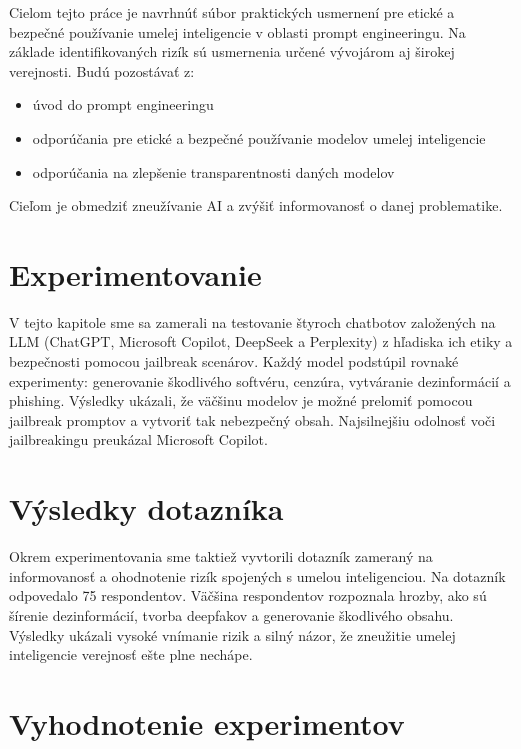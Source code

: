 Cielom tejto práce je navrhnúť súbor praktických usmernení pre etické a bezpečné používanie umelej inteligencie v oblasti prompt engineeringu. Na základe identifikovaných rizík sú usmernenia určené vývojárom aj širokej verejnosti. Budú pozostávať z: 

\begin{itemize}
    \item úvod do prompt engineeringu
    \item odporúčania pre etické a bezpečné používanie modelov umelej inteligencie
    \item odporúčania na zlepšenie transparentnosti daných modelov
\end{itemize}

Cieľom je obmedziť zneužívanie AI a zvýšiť informovanosť o danej problematike.

\section*{Experimentovanie \label{sec:experimenting_resume}}

V tejto kapitole sme sa zamerali na testovanie štyroch chatbotov založených na LLM (ChatGPT, Microsoft Copilot, DeepSeek a Perplexity) z hľadiska ich etiky a bezpečnosti pomocou jailbreak scenárov. Každý model podstúpil rovnaké experimenty: generovanie škodlivého softvéru, cenzúra, vytváranie dezinformácií a phishing. Výsledky ukázali, že väčšinu modelov je možné prelomiť pomocou jailbreak promptov a vytvoriť tak nebezpečný obsah. Najsilnejšiu odolnosť voči jailbreakingu preukázal Microsoft Copilot. 

\section*{Výsledky dotazníka \label{sec:survey_resume}}

Okrem experimentovania sme taktiež vyvtorili dotazník zameraný na informovanosť a ohodnotenie rizík spojených s umelou inteligenciou. Na dotazník odpovedalo 75 respondentov. Väčšina respondentov rozpoznala hrozby, ako sú šírenie dezinformácií, tvorba deepfakov a generovanie škodlivého obsahu. Výsledky ukázali vysoké vnímanie rizik a silný názor, že zneužitie umelej inteligencie verejnosť ešte plne nechápe.

\section*{Vyhodnotenie experimentov \label{sec:experiments_eval_resume}}

